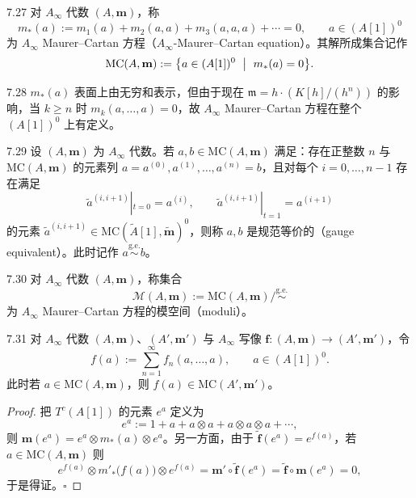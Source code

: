 
\begin{definition}{7.27}
对 $A_\infty$ 代数 $(A,\mathbf m)$，称
\[
  m_{*}(a):=m_{1}(a)+m_{2}(a,a)+m_{3}(a,a,a)+\cdots=0,\qquad a\in(A[1])^{0}
\]
为 $A_\infty$ Maurer--Cartan 方程（$A_\infty$-Maurer--Cartan equation）。其解所成集合记作
\[
  \mathrm{MC}(A,\mathbf m):=\bigl\{a\in(A[1])^{0}\ \bigm|\ m_{*}(a)=0\bigr\}.
\]
\end{definition}

\begin{remark}{7.28}
$m_{*}(a)$ 表面上由无穷和表示，但由于现在 $\mathfrak m=h\cdot(K[h]/(h^{n}))$ 的影响，当 $k\ge n$ 时 $m_{k}(a,\dots,a)=0$，故 $A_\infty$ Maurer--Cartan 方程在整个 $(A[1])^{0}$ 上有定义。
\end{remark}

\begin{definition}{7.29}
设 $(A,\mathbf m)$ 为 $A_\infty$ 代数。若 $a,b\in\mathrm{MC}(A,\mathbf m)$ 满足：存在正整数 $n$ 与 $\mathrm{MC}(A,\mathbf m)$ 的元素列 $a=a^{(0)},a^{(1)},\dots,a^{(n)}=b$，且对每个 $i=0,\dots,n-1$ 存在满足
\[
  \tilde a^{(i,i+1)}|_{t=0}=a^{(i)},\qquad \tilde a^{(i,i+1)}|_{t=1}=a^{(i+1)}
\]
的元素 $\tilde a^{(i,i+1)}\in\mathrm{MC}(\tilde A[1],\tilde{\mathbf m})^{0}$，则称 $a,b$ 是规范等价的（gauge equivalent）。此时记作 $a\overset{\mathrm{g.e.}}{\sim}b$。
\end{definition}

\begin{definition}{7.30}
对 $A_\infty$ 代数 $(A,\mathbf m)$，称集合
\[
  \mathcal M(A,\mathbf m):=\mathrm{MC}(A,\mathbf m)\big/\overset{\mathrm{g.e.}}{\sim}
\]
为 $A_\infty$ Maurer--Cartan 方程的模空间（moduli）。
\end{definition}

\begin{proposition}{7.31}
对 $A_\infty$ 代数 $(A,\mathbf m)$、$(A',\mathbf m')$ 与 $A_\infty$ 写像 $\mathbf f\colon(A,\mathbf m)\to(A',\mathbf m')$，令
\[
  f(a):=\sum_{n=1}^{\infty}f_{n}(a,\dots,a),\qquad a\in(A[1])^{0}.
\]
此时若 $a\in\mathrm{MC}(A,\mathbf m)$，则 $f(a)\in\mathrm{MC}(A',\mathbf m')$。
\end{proposition}

\begin{proof}
把 $T^{c}(A[1])$ 的元素 $e^{a}$ 定义为
\[
  e^{a}:=1+a+a\otimes a+a\otimes a\otimes a+\cdots,
\]
则 $\mathbf m(e^{a})=e^{a}\otimes m_{*}(a)\otimes e^{a}$。另一方面，由于 $\tilde{\mathbf f}(e^{a})=e^{f(a)}$，若 $a\in\mathrm{MC}(A,\mathbf m)$ 则
\[
  e^{f(a)}\otimes m'_{*}\bigl(f(a)\bigr)\otimes e^{f(a)}=\mathbf m'\circ\tilde{\mathbf f}(e^{a})=\tilde{\mathbf f}\circ\mathbf m(e^{a})=0,
\]
于是得证。\hfill$\square$
\end{proof}

